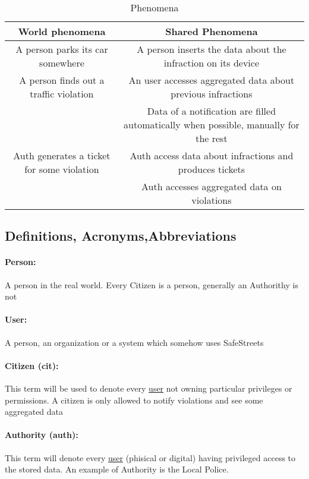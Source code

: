 \documentclass{article}
\begin{document}
		\begin{table}[h]
			\begin{center}
				\caption{Phenomena}
				\small
				\label{Phenomena}
				\begin{tabular}{c|c}
					\textbf{World phenomena}&\textbf{Shared Phenomena}\\
					\hline
					A person parks its car somewhere&A person inserts the data about the infraction on its device\\
					A person finds out a traffic violation&An user accesses aggregated data about previous infractions\\
						&Data of a notification are filled automatically when possible, manually for the rest\\
					\hline
					Auth generates a ticket for some violation&Auth access data about infractions and produces tickets\\
					&Auth accesses aggregated data on violations\\
					
				\end{tabular}
			\end{center}
		\end{table}
		
	\subsection{Definitions, Acronyms,Abbreviations} \label{definitions}
		\paragraph{Person:}A person in the real world. Every Citizen is a person, generally an Authorithy is not
		\paragraph{User:}A person, an organization or a system which somehow uses SafeStreets
		\paragraph{Citizen (cit):} This term will be used to denote every \underline{user} not owning particular privileges or permissions. A citizen is only allowed to notify violations and see some aggregated data
		\paragraph{Authority (auth):} This term will denote every \underline{user} (phisical or digital) having privileged access to the stored data. An example of Authority is the Local Police.
\end{document}
